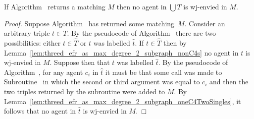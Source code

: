 \begin{lem}
\label{lem:threed_efr_as_wjenvy_max_deg_2_no_agent_in_bigcupT_is_wjenvied}
If Algorithm~ returns a matching $M$ then no agent in $\bigcup T$ is wj-envied in $M$.
\end{lem}
\begin{proof}
Suppose Algorithm~ has returned some matching~$M$. Consider an arbitrary triple $t \in T$. By the pseudocode of Algorithm~ there are two possibilities: either $t \in \hat{T}$ or $t$ was labelled $\hat{t}$. If $t \in \hat{T}$ then by Lemma~\ref{lem:threed_efr_as_max_degree_2_subgraph_nonC4s} no agent in $t$ is wj-envied in $M$. Suppose then that $t$ was labelled $\hat{t}$. By the pseudocode of Algorithm~, for any agent $c_i$ in $\hat{t}$ it must be that some call was made to Subroutine~ in which the second or third argument was equal to $c_i$ and then the two triples returned by the subroutine were added to $M$. By Lemma~\ref{lem:threed_efr_as_max_degree_2_subgraph_oneC4TwoSingles}, it follows that no agent in $\hat{t}$ is wj-envied in $M$.
\end{proof}

